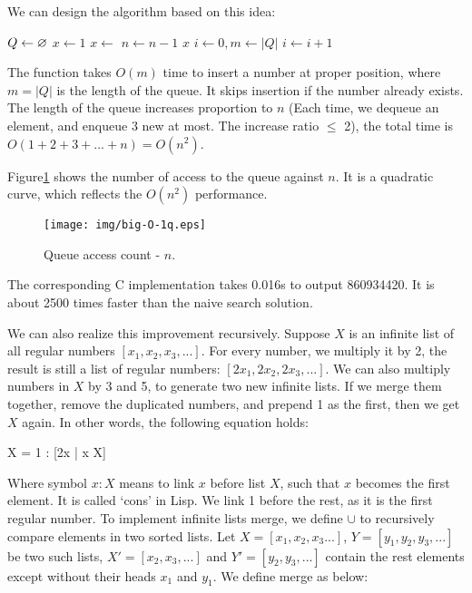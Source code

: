 \documentclass[b5paper]{article}
\begin{document}
We can design the algorithm based on this idea:

\begin{algorithmic}[1]
  \State $Q \gets \varnothing$
  \State $x \gets 1$
  \State {}
    \State $x \gets$ 
    \State {}
    \State {}
    \State {}
    \State $n \gets n-1$
  \EndWhile
  \State \Return $x$
\EndFunction
\Statex
{}
  \State $i \gets 0, m \gets |Q|$
    \State $i \gets i + 1$
  \EndWhile
    \State {}
  \EndIf
\EndFunction
\end{algorithmic}

The  function takes $O(m)$ time to insert a number at proper position, where $m = |Q|$ is the length of the queue. It skips insertion if the number already exists. The length of the queue increases proportion to $n$ (Each time, we dequeue an element, and enqueue 3 new at most. The increase ratio $\leq$ 2), the total time is $O(1 + 2 + 3 + ... + n) = O(n^2)$.

Figure\ref{fig:big-O-1q} shows the number of access to the queue against $n$. It is a quadratic curve, which reflects the $O(n^2)$ performance.

\begin{figure}[htbp]
  \centering
  \texttt{[image: img/big-O-1q.eps]}
  \caption{Queue access count - $n$.} \label{fig:big-O-1q}
\end{figure}

The corresponding C implementation takes 0.016s to output 860934420. It is about 2500 times faster than the naive search solution.

We can also realize this improvement recursively. Suppose $X$ is an infinite list of all regular numbers $[x_1, x_2, x_3, ...]$. For every number, we multiply it by 2, the result is still a list of regular numbers: $[2x_1, 2x_2, 2x_3, ...]$. We can also multiply numbers in $X$ by 3 and 5, to generate two new infinite lists. If we merge them together, remove the duplicated numbers, and prepend 1 as the first, then we get $X$ again. In other words, the following equation holds:

\be
  X = 1 : [2x | \forall x \in X]\cup [3x | \forall x \in X] \cup [5x | \forall x \in X]
\ee

Where symbol $x : X$ means to link $x$ before list $X$, such that $x$ becomes the first element. It is called `cons' in Lisp. We link 1 before the rest, as it is the first regular number. To implement infinite lists merge, we define $\cup$ to recursively compare elements in two sorted lists. Let $X=[x_1, x_2, x_3...]$, $Y=[y_1, y_2, y_3, ...]$ be two such lists, $X' = [x_2, x_3, ...]$ and $Y'=[y_2, y_3, ...]$ contain the rest elements except without their heads $x_1$ and $y_1$. We define merge as below:
\end{document}
